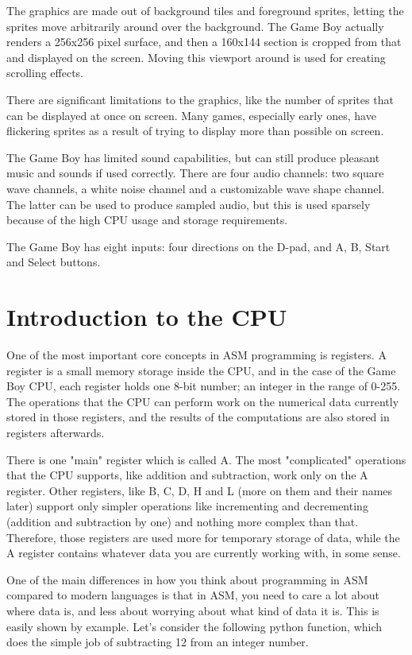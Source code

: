 \documentclass[11pt]{book}
\begin{document}
The graphics are made out of background tiles and foreground sprites, letting the sprites move arbitrarily around over the background. The Game Boy actually renders a 256x256 pixel surface, and then a 160x144 section is cropped from that and displayed on the screen. Moving this viewport around is used for creating scrolling effects.

There are significant limitations to the graphics, like the number of sprites that can be displayed at once on screen. Many games, especially early ones, have flickering sprites as a result of trying to display more than possible on screen. 

The Game Boy has limited sound capabilities, but can still produce pleasant music and sounds if used correctly. There are four audio channels: two square wave channels, a white noise channel and a customizable wave shape channel. The latter can be used to produce sampled audio, but this is used sparsely because of the high CPU usage and storage requirements. 

The Game Boy has eight inputs: four directions on the D-pad, and A, B, Start and Select buttons. 


\section{Introduction to the CPU}
\label{cpu}
One of the most important core concepts in ASM programming is registers. A register is a small memory storage inside the CPU, and in the case of the Game Boy CPU, each register holds one 8-bit number; an integer in the range of 0-255. The operations that the CPU can perform work on the numerical data currently stored in those registers, and the results of the computations are also stored in registers afterwards. 

There is one "main" register which is called A. The most "complicated" operations that the CPU supports, like addition and subtraction, work only on the A register. Other registers, like B, C, D, H and L (more on them and their names later) support only simpler operations like incrementing and decrementing (addition and subtraction by one) and nothing more complex than that. Therefore, those registers are used more for temporary storage of data, while the A register contains whatever data you are currently working with, in some sense.

One of the main differences in how you think about programming in ASM compared to modern languages is that in ASM, you need to care a lot about where data is, and less about worrying about what kind of data it is. This is easily shown by example. Let's consider the following python function, which does the simple job of subtracting 12 from an integer number.
\end{document}
